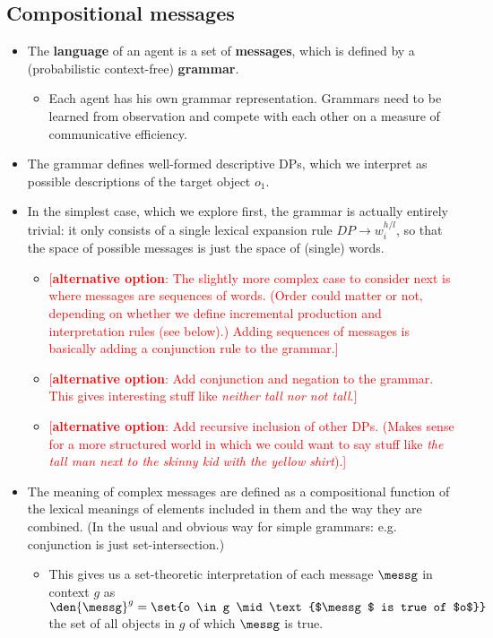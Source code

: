\documentclass[fleqn,reqno,12pt]{article}
\newcommand{\optional}[1]{\textcolor{Red}{[\textbf{alternative option}: #1]}}
\newcommand{\word}{\ensuremath{w}}
\begin{document}
\subsection{Compositional messages}
\label{sec:comp-mess}

\begin{itemize}
\item The \textbf{language} of an agent is a set of \textbf{messages}, which is defined by a
  (probabilistic context-free) \textbf{grammar}.
  \begin{itemize}
  \item Each agent has his own grammar representation. Grammars need to be learned from
    observation and compete with each other on a measure of communicative efficiency.
  \end{itemize}
\item The grammar defines well-formed descriptive DPs, which we interpret as possible
  descriptions of the target object $o_1$.
\item In the simplest case, which we explore first, the grammar is actually entirely trivial:
  it only consists of a single lexical expansion rule $DP \rightarrow \word_i^{h/l}$, so that
  the space of possible messages is just the space of (single) words.
  \begin{itemize}
  \item \optional{The slightly more complex case to consider next is where messages are
      sequences of words. (Order could matter or not, depending on whether we define
      incremental production and interpretation rules (see below).) Adding sequences of
      messages is basically adding a conjunction rule to the grammar.}
  \item \optional{Add conjunction and negation to the grammar. This gives interesting stuff
      like \emph{neither tall nor not tall}.}
  \item \optional{Add recursive inclusion of other DPs. (Makes sense for a more structured
      world in which we could want to say stuff like \emph{the tall man next to the skinny kid
        with the yellow shirt}).}
  \end{itemize}
\item The meaning of complex messages are defined as a compositional function of the lexical
  meanings of elements included in them and the way they are combined. (In the usual and
  obvious way for simple grammars: e.g. conjunction is just set-intersection.)
  \begin{itemize}
  \item This gives us a set-theoretic interpretation of each message $\messg$ in context $g$ as
    $\den{\messg}^g = \set{o \in g \mid \text{$\messg$ is true of $o$}}$
    the set of all objects in $g$ of which $\messg$ is true.
  \end{itemize}

\end{itemize}
\end{document}
